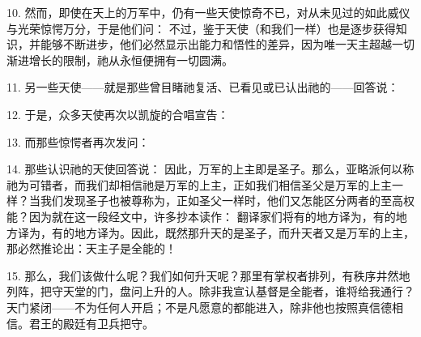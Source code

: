 10. 然而，即使在天上的万军中，仍有一些天使惊奇不已，对从未见过的如此威仪与光荣惊愕万分，于是他们问： 不过，鉴于天使（和我们一样）也是逐步获得知识，并能够不断进步，他们必然显示出能力和悟性的差异，因为唯一天主超越一切渐进增长的限制，祂从永恒便拥有一切圆满。\par

11. 另一些天使——就是那些曾目睹祂复活、已看见或已认出祂的——回答说：\par

12. 于是，众多天使再次以凯旋的合唱宣告：\par

13. 而那些惊愕者再次发问：\par

14. 那些认识祂的天使回答说： 因此，万军的上主即是圣子。那么，亚略派何以称祂为可错者，而我们却相信祂是万军的上主，正如我们相信圣父是万军的上主一样？当我们发现圣子也被尊称为，正如圣父一样时，他们又怎能区分两者的至高权能？因为就在这一段经文中，许多抄本读作： 翻译家们将有的地方译为，有的地方译为，有的地方译为。因此，既然那升天的是圣子，而升天者又是万军的上主，那必然推论出：天主子是全能的！\par

\par

15. 那么，我们该做什么呢？我们如何升天呢？那里有掌权者排列，有秩序井然地列阵，把守天堂的门，盘问上升的人。除非我宣认基督是全能者，谁将给我通行？天门紧闭——不为任何人开启；不是凡愿意的都能进入，除非他也按照真信德相信。君王的殿廷有卫兵把守。\par

